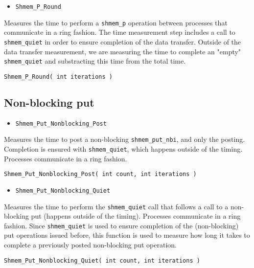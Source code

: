 \documentclass[12pt, letterpaper]{article}
\begin{document}
\begin{itemize}
    \item {\tt Shmem\_P\_Round}
\end{itemize}

Measures the time to perform a {\tt shmem\_p} operation between processes that communicate in a ring fashion. The time measurement step includes a call to {\tt shmem\_quiet} in order to ensure completion of the data transfer. Outside of the data transfer measurement, we are measuring the time to complete an "empty" {\tt shmem\_quiet} and substracting this time from the total time.

\begin{lstlisting}
Shmem_P_Round( int iterations ) 
\end{lstlisting}

\subsection{Non-blocking put}

\begin{itemize}
    \item {\tt Shmem\_Put\_Nonblocking\_Post}
\end{itemize}

Measures the time to post a non-blocking {\tt shmem\_put\_nbi}, and only the posting. Completion is ensured with {\tt shmem\_quiet}, which happens outside of the timing. Processes communicate in a ring fashion.

\begin{lstlisting}
Shmem_Put_Nonblocking_Post( int count, int iterations )
\end{lstlisting}

\begin{itemize}
    \item {\tt Shmem\_Put\_Nonblocking\_Quiet}
\end{itemize}

Measures the time to perform the {\tt shmem\_quiet} call that follows a call to a non-blocking put (happens outside of the timing). Processes communicate in a ring fashion. Since {\tt shmem\_quiet} is used to ensure completion of the (non-blocking) put operations issued before, this function is used to measure how long it takes to complete a previously posted non-blocking put operation.

\begin{lstlisting}
Shmem_Put_Nonblocking_Quiet( int count, int iterations )
\end{lstlisting}
\end{document}
